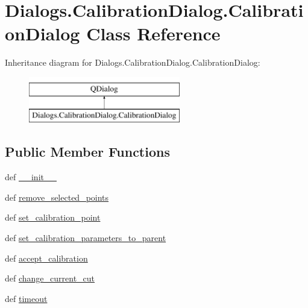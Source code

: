 \hypertarget{classDialogs_1_1CalibrationDialog_1_1CalibrationDialog}{\section{Dialogs.\-Calibration\-Dialog.\-Calibration\-Dialog Class Reference}
\label{classDialogs_1_1CalibrationDialog_1_1CalibrationDialog}
}
Inheritance diagram for Dialogs.\-Calibration\-Dialog.\-Calibration\-Dialog\-:\begin{figure}[H]
\begin{center}
\leavevmode
\includegraphics[height=2.000000cm]{classDialogs_1_1CalibrationDialog_1_1CalibrationDialog}
\end{center}
\end{figure}
\subsection*{Public Member Functions}
\begin{DoxyCompactItemize}
\item 
def \hyperlink{classDialogs_1_1CalibrationDialog_1_1CalibrationDialog_a187759c1babdaa11a4f6bc9988c83d30}{\-\_\-\-\_\-init\-\_\-\-\_\-}
\item 
def \hyperlink{classDialogs_1_1CalibrationDialog_1_1CalibrationDialog_a2bc841733761278b2d3db45e9d1f98de}{remove\-\_\-selected\-\_\-points}
\item 
def \hyperlink{classDialogs_1_1CalibrationDialog_1_1CalibrationDialog_a3391e2bc6c7a8b8f65b86f32f3b2794b}{set\-\_\-calibration\-\_\-point}
\item 
def \hyperlink{classDialogs_1_1CalibrationDialog_1_1CalibrationDialog_a93c6577ff5f78c87c49519aebd6b48d9}{set\-\_\-calibration\-\_\-parameters\-\_\-to\-\_\-parent}
\item 
def \hyperlink{classDialogs_1_1CalibrationDialog_1_1CalibrationDialog_a8d446c99157afc3c8871d155c55a26c9}{accept\-\_\-calibration}
\item 
def \hyperlink{classDialogs_1_1CalibrationDialog_1_1CalibrationDialog_a62fe769b56ecb7dec14b6e14542e461c}{change\-\_\-current\-\_\-cut}
\item 
def \hyperlink{classDialogs_1_1CalibrationDialog_1_1CalibrationDialog_a16592d0bc33cb3e74caf02be88d24441}{timeout}
\end{DoxyCompactItemize}
